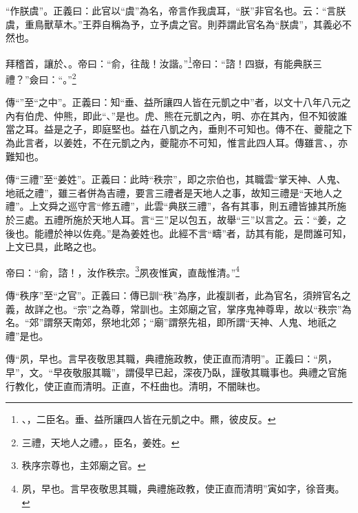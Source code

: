{\noindent\zhuan{}\fzbyks “作朕虞”。正義曰：此官以“虞”為名，帝言作我虞耳，“朕”非官名也。云：“言朕虞，重鳥獸草木。”王莽自稱為予，立予虞之官。則莽謂此官名為“朕虞”，其義必不然也。 \par}

拜稽首，讓於、。帝曰：“俞，往哉！汝諧。”\footnote{、，二臣名。垂、益所讓四人皆在元凱之中。羆，彼皮反。}帝曰：“諮！四嶽，有能典朕三禮？”僉曰：“。”\footnote{三禮，天地人之禮。，臣名，姜姓。}

{\noindent\zhuan{}\fzbyks 傳“”至“之中”。正義曰：知“垂、益所讓四人皆在元凱之中”者，以文十八年八元之內有伯虎、仲熊，即此“、”是也。虎、熊在元凱之內，明、亦在其內，但不知彼誰當之耳。益是之子，即庭堅也。益在八凱之內，垂則不可知也。傳不在、夔龍之下為此言者，以姜姓，不在元凱之內，夔龍亦不可知，惟言此四人耳。傳雖言、，亦難知也。 \par}

{\noindent\zhuan{}\fzbyks 傳“三禮”至“姜姓”。正義曰：此時“秩宗”，即之宗伯也，其職雲“掌天神、人鬼、地祇之禮”，雖三者併為吉禮，要言三禮者是天地人之事，故知三禮是“天地人之禮”。上文舜之巡守言“修五禮”，此雲“典朕三禮”，各有其事，則五禮皆據其所施於三處。五禮所施於天地人耳。言“三”足以包五，故舉“三”以言之。云：“姜，之後也。能禮於神以佐堯。”是為姜姓也。此經不言“疇”者，訪其有能，是問誰可知，上文已具，此略之也。 \par}

帝曰：“俞，諮！，汝作秩宗。\footnote{秩序宗尊也，主郊廟之官。}夙夜惟寅，直哉惟清。”\footnote{夙，早也。言早夜敬思其職，典禮施政教，使正直而清明”寅如字，徐音夷。}

{\noindent\zhuan{}\fzbyks 傳“秩序”至“之官”。正義曰：傳已訓“秩”為序，此複訓者，此為官名，須辨官名之義，故詳之也。“宗”之為尊，常訓也。主郊廟之官，掌序鬼神尊卑，故以“秩宗”為名。“郊”謂祭天南郊，祭地北郊；“廟”謂祭先祖，即所謂“天神、人鬼、地祇之禮”是也。 \par}

{\noindent\zhuan{}\fzbyks 傳“夙，早也。言早夜敬思其職，典禮施政教，使正直而清明”。正義曰：“夙，早”，文。“早夜敬服其職”，謂侵早已起，深夜乃臥，謹敬其職事也。典禮之官施行教化，使正直而清明。正直，不枉曲也。清明，不闇昧也。 \par}

